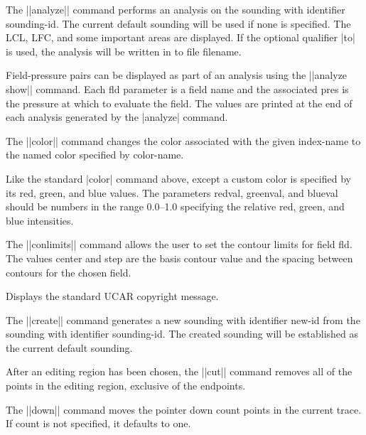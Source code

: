 \begin{glossarylist}
	The ||analyze|| command performs an analysis on the sounding with 
	identifier {\pf sounding-id}.  The current default sounding will be
	used if none is specified.  The LCL, LFC, and some important
	areas are displayed.  If the optional qualifier |to| is used, the
	analysis will be written in to file {\pf filename}.

	Field-pressure pairs can be displayed as part of an analysis using
	the ||analyze show|| command.  Each {\pf fld} parameter is a field
	name and the associated {\pf pres} is the pressure at which to
	evaluate the field.  The values are printed at the end of each
	analysis generated by the |analyze| command.

	The ||color|| command changes the color associated with the given
	{\pf index-name} to the named color specified by {\pf color-name}.

	Like the standard |color| command above, except a custom color is
	specified by its red, green, and blue values.  The parameters
	{\pf redval}, {\pf greenval}, and {\pf blueval} should be numbers in
	the range 0.0--1.0 specifying the relative red, green, and blue 
	intensities.

	The ||conlimits|| command allows the user to set the contour limits
	for field {\pf fld}.  The values {\pf center} and {\pf step} are
	the basis contour value and the spacing between contours for the
	chosen field.

	Displays the standard UCAR copyright message.

	The ||create|| command generates a new sounding with 
	identifier {\pf new-id} from the sounding with identifier 
	{\pf sounding-id}.  The created sounding will be established as
	the current default sounding.

	After an editing region has been chosen, the ||cut|| command removes
	all of the points in the editing region, exclusive of the endpoints.

	The ||down|| command moves the pointer down {\pf count} points in the
	current trace.  If {\pf count} is not specified, it defaults to one.


\end{glossarylist}
